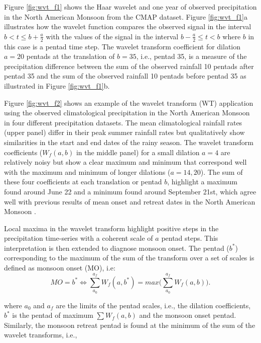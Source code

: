 Figure \ref{fig:wvt_f1} shows the Haar wavelet and one year of observed precipitation in the North American Monsoon from the CMAP dataset. Figure \ref{fig:wvt_f1}a illustrates how the wavelet function compares the observed signal in the interval $ b < t \leq b+\frac{a}{2}$ with the values of the signal in the interval $b-\frac{a}{2} \leq t < b$ where $b$ in this case is a pentad time step. The wavelet transform coefficient for dilation $a=20$ pentads at the translation of $b=35$, i.e., pentad 35, is a measure of the precipitation difference between the sum of the observed rainfall 10 pentads after pentad 35 and the sum of the observed rainfall 10 pentads before pentad 35 as illustrated in Figure \ref{fig:wvt_f1}b.


Figure \ref{fig:wvt_f2} shows an example of the wavelet transform (WT) application using the observed climatological precipitation in the North American Monsoon in four different precipitation datasets.
The mean climatological rainfall rates (upper panel) differ in their peak summer rainfall rates but qualitatively show similarities in the start and end dates of the rainy season. 
The wavelet transform coefficients ($W_f(a,b)$ in the middle panel) for a small dilation $a=4$ are relatively noisy but show a clear maximum and minimum that correspond well with the maximum and minimum of longer dilations ($a=14,20$). The sum of these four coefficients at each translation or pentad $b$, highlight a maximum found around June 22 and a minimum found around September 21st, which agree well with previous results of mean onset and retreat dates in the North American Monsoon  \citep[e.g.][]{arias2012,geil2013}.

Local maxima in the wavelet transform highlight positive steps in the precipitation time-series with a coherent scale of $a$ pentad steps. This interpretation is then extended to diagnose monsoon onset. 
 The pentad ($b^*$) corresponding to the maximum of the sum of the transform over a set of scales is defined as monsoon onset (MO), i.e: 
\begin{equation}
MO=b^* \Leftrightarrow \sum_{a_0}^{a_f} W_f(a,b^*)=max\bigg(\sum_{a_0}^{a_f} W_f(a,b)\bigg).
\label{eq:mo}
\end{equation}

\noindent where $a_0$ and $a_f$ are the limits of the pentad scales, i.e., the dilation coefficients, $b^*$ is the pentad of maximum $\sum W_f(a,b)$ and the monsoon onset pentad.
Similarly, the monsoon retreat pentad is found at the minimum of the sum of the wavelet transforms, i.e.,

